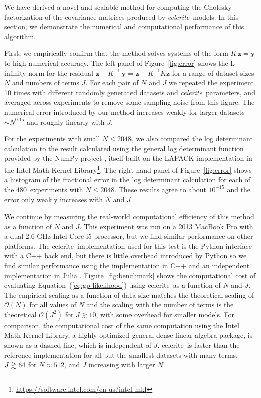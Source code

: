 \documentclass[manuscript, letterpaper]{aastex6}
\makeatletter
\let\origsubsection\subsection
\renewcommand\subsection{\@ifstar{\starsubsection}{\nostarsubsection}}
\newcommand\nostarsubsection[1]{\subsectionprelude\origsubsection{#1}}
\newcommand\starsubsection[1]{\subsectionprelude\origsubsection*{#1}}
\newcommand\subsectionprelude{\vspace{1em}}
\newcommand{\project}[1]{\textsf{#1}}
\newcommand{\celerite}{\project{celerite}}
\newcommand{\celeriteterm}{\emph{celerite}}
\newcommand{\figureref}[1]{\ref{fig:#1}}
\newcommand{\Figure}[1]{Figure~\figureref{#1}}
\renewcommand{\eqref}[1]{\ref{eq:#1}}
\newcommand{\Eq}[1]{Equation~(\eqref{#1})}
\newcommand{\eq}[1]{\Eq{#1}}
\newcommand{\bvec}[1]{{\ensuremath{\boldsymbol{#1}}}}
\makeatother
\begin{document}
{\subsection{Performance}

We have derived a novel and scalable method for computing the Cholesky
factorization of the covariance matrices produced by \celeriteterm\ models.
In this section, we demonstrate the numerical and computational performance of
this algorithm.

First, we empirically confirm that the method solves systems of the form
$K\,\bvec{z} = \bvec{y}$ to high numerical accuracy.
The left panel of \Figure{error} shows the L-infinity norm for the residual
$\bvec{z} - K^{-1}\,\bvec{y} = \bvec{z}-K^{-1}K\bvec{z}$ for a range of dataset sizes $N$ and numbers of terms $J$.
For each pair of $N$ and $J$ we repeated the experiment 10 times with
different randomly generated datasets and \celeriteterm\ parameters, and
averaged across experiments to remove some sampling noise from this figure.
The numerical error introduced by our method increases weakly for larger
datasets $\sim N^{0.15}$ and roughly linearly with $J$.

For the experiments with small $N \le 2048$, we also compared the log
determinant calculation to the result calculated using the general log
determinant function provided by the \project{NumPy} project
\citep{Van-Der-Walt:2011}, itself built on the \project{LAPACK}
\citep{Anderson:1999} implementation in the Intel Math Kernel
Library\footnote{\url{https://software.intel.com/en-us/intel-mkl}}.
The right-hand panel of \Figure{error} shows a histogram of the fractional
error in the log determinant calculation for each of the 480~experiments with
$N \le 2048$.
These results agree to about $10^{-15}$ and the error only weakly increases
with $N$ and $J$.

We continue by measuring the real-world computational efficiency of this
method as a function of $N$ and $J$.
This experiment was run on a 2013 MacBook Pro with a dual 2.6 GHz Intel Core
i5 processor, but we find similar performance on other platforms.
The \celerite\ implementation used for this test is the \project{Python}
interface with a \project{C++} back end, but there is little overhead
introduced by \project{Python} so we find similar performance using
the implementation in \project{C++} and an independent implementation in
\project{Julia} \citep{Bezanzon:2012}.
\Figure{benchmark} shows the computational cost of evaluating
\eq{gp-likelihood} using \celerite\ as a function of $N$ and $J$.
The empirical scaling as a function of data size matches the theoretical
scaling of $\mathcal{O}(N)$ for all values of $N$ and the scaling with the
number of terms is the theoretical $\mathcal{O}(J^2)$ for $J \gtrsim 10$, with
some overhead for smaller models.
For comparison, the computational cost of the same computation using the Intel
Math Kernel Library, a highly optimized general dense linear algebra package,
is shown as a dashed line, which is independent of $J$.
\celerite\ is faster than the reference implementation for all but the
smallest datasets with many terms, $J \gtrsim 64$ for $N\approx 512$,
and $J$ increasing with larger $N$.

}
\end{document}
